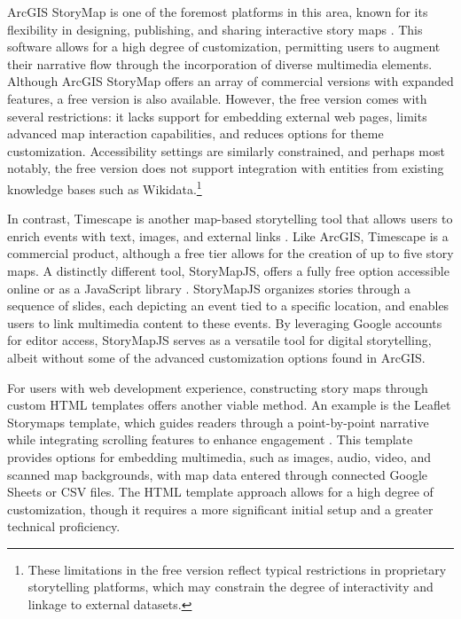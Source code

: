 ArcGIS StoryMap is one of the foremost platforms in this area, known for its flexibility in designing, publishing, and sharing interactive story maps \cite{walsheUsingArcGISOnline2016}. This software allows for a high degree of customization, permitting users to augment their narrative flow through the incorporation of diverse multimedia elements. Although ArcGIS StoryMap offers an array of commercial versions with expanded features, a free version is also available. However, the free version comes with several restrictions: it lacks support for embedding external web pages, limits advanced map interaction capabilities, and reduces options for theme customization. Accessibility settings are similarly constrained, and perhaps most notably, the free version does not support integration with entities from existing knowledge bases such as Wikidata.\footnote{These limitations in the free version reflect typical restrictions in proprietary storytelling platforms, which may constrain the degree of interactivity and linkage to external datasets.}

In contrast, Timescape is another map-based storytelling tool that allows users to enrich events with text, images, and external links \cite{Timescape}. Like ArcGIS, Timescape is a commercial product, although a free tier allows for the creation of up to five story maps. A distinctly different tool, StoryMapJS, offers a fully free option accessible online or as a JavaScript library \cite{knightlabStoryMapJS}. StoryMapJS organizes stories through a sequence of slides, each depicting an event tied to a specific location, and enables users to link multimedia content to these events. By leveraging Google accounts for editor access, StoryMapJS serves as a versatile tool for digital storytelling, albeit without some of the advanced customization options found in ArcGIS.

For users with web development experience, constructing story maps through custom HTML templates offers another viable method. An example is the Leaflet Storymaps template, which guides readers through a point-by-point narrative while integrating scrolling features to enhance engagement \cite{sveenAtlefrenStorymap2024}. This template provides options for embedding multimedia, such as images, audio, video, and scanned map backgrounds, with map data entered through connected Google Sheets or CSV files. The HTML template approach allows for a high degree of customization, though it requires a more significant initial setup and a greater technical proficiency.

